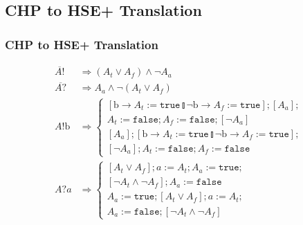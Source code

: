 \documentclass[compress]{beamer}
\begin{document}
\subsection{CHP to HSE+ Translation}
\begin{frame}
    \frametitle{CHP to HSE+ Translation}
    \small
    \begin{align*}
        \overline{A!} & \Rightarrow (A_t \vee A_f) \wedge \neg A_a \\
        \overline{A?} & \Rightarrow A_a \wedge \neg (A_t \vee A_f) \\
        A!\mathrm{b} & \Rightarrow \left\{ \begin{matrix} [\mathrm{b} \rightarrow A_t := \mathtt{true} \talloblong \neg \mathrm{b} \rightarrow A_f := \mathtt{true}]; [A_a];\\ A_t := \mathtt{false}; A_f := \mathtt{false}; [\neg A_a] \\
                                                          [A_a]; [\mathrm{b} \rightarrow A_t := \mathtt{true} \talloblong \neg \mathrm{b} \rightarrow A_f := \mathtt{true}];\\ [\neg A_a]; A_t := \mathtt{false}; A_f := \mathtt{false} \end{matrix} \right. \\
        A?a & \Rightarrow \left\{ \begin{matrix} [A_t \vee A_f]; a := A_t; A_a := \mathtt{true};\\ [\neg A_t \wedge \neg A_f]; A_a := \mathtt{false} \\
                                                 A_a := \mathtt{true}; [A_t \vee A_f]; a := A_t;\\ A_a := \mathtt{false}; [\neg A_t \wedge \neg A_f] \end{matrix} \right. \\
    \end{align*}
\end{frame}
\end{document}
